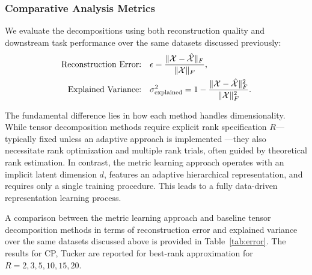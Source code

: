 \documentclass[a4paper,12pt,reqno]{amsart}
\newcommand{\revised}[1]{{\color{black}{#1}}}
\theoremstyle{definition}
\theoremstyle{remark}
\begin{document}
\subsubsection{Comparative Analysis Metrics}
We evaluate the decompositions using both reconstruction quality and downstream task performance over the same datasets discussed previously:
\begin{align}
	\text{Reconstruction Error:} \quad & \epsilon = \frac{\|\mathcal{X} - \hat{\mathcal{X}}\|_F}{\|\mathcal{X}\|_F}, \notag \\
	\text{Explained Variance:} \quad & \sigma^2_{\text{explained}} = 1 - \frac{\|\mathcal{X} - \hat{\mathcal{X}}\|_F^2}{\|\mathcal{X}\|_F^2}. \notag 
\end{align}

The fundamental difference lies in how each method handles dimensionality. While tensor decomposition methods require explicit rank specification $R$—typically fixed unless an adaptive approach is implemented \cite{DektorRodgersVenturi2021, sedighin2021adaptive}—they also necessitate rank optimization and multiple rank trials, often guided by theoretical rank estimation. In contrast, the metric learning approach operates with an implicit latent dimension $d$, features an adaptive hierarchical representation, and requires only a single training procedure. This leads to a fully data-driven representation learning process.

A comparison between the metric learning approach and baseline tensor decomposition methods in terms of reconstruction error and explained variance over the same datasets discussed above is provided in Table~\ref{tab:error}. The results for CP, Tucker \revised{and t-SVD} are reported for best-rank approximation for $R=2, 3, 5, 10, 15, 20$. 
\end{document}
